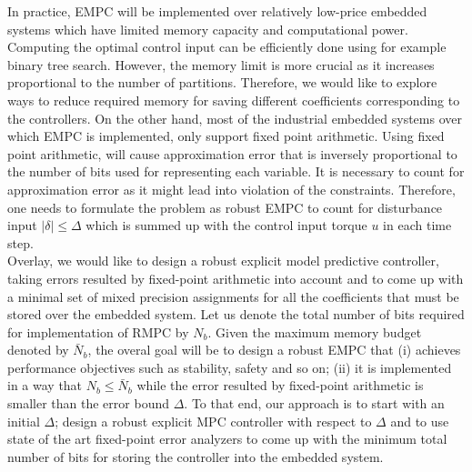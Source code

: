 	In practice, EMPC will be implemented over relatively low-price embedded systems which have limited memory capacity and computational power. Computing the optimal control input can be efficiently done using for example binary tree search. However, the memory limit is more crucial as it increases proportional to the number of partitions.	Therefore, we would like to explore ways to reduce required memory for saving different coefficients corresponding to the controllers.
	On the other hand, most of the industrial embedded systems over which EMPC is implemented, only support fixed point arithmetic. Using fixed point arithmetic, will cause approximation error that is inversely proportional to the number of bits used for representing each variable. It is necessary to count for approximation error as it might lead into violation of the constraints. Therefore, one needs to formulate the problem as robust EMPC to count for disturbance input $|\delta|\leq \Delta$ which is summed up with the control input torque $u$ in each time step.\\ %
	Overlay, we would like to design a robust explicit model predictive controller, taking errors resulted by fixed-point arithmetic into account and to come up with a minimal set of mixed precision assignments for all the coefficients that must be stored over the embedded system. Let us denote the total number of bits required for implementation of RMPC by $N_b$. Given the maximum memory budget denoted by $\bar N_b$, the overal goal will be to design a robust EMPC that (i) achieves performance objectives such as stability, safety and so on; (ii) it is implemented in a way that $N_b\leq \bar N_b$ while the error resulted by fixed-point arithmetic is smaller than the error bound $\Delta$. To that end, our approach is to start with an initial $\Delta$; design a robust explicit MPC controller with respect to $\Delta$ and to use state of the art fixed-point error analyzers to come up with the minimum total number of bits for storing the controller into the embedded system.\\
	
